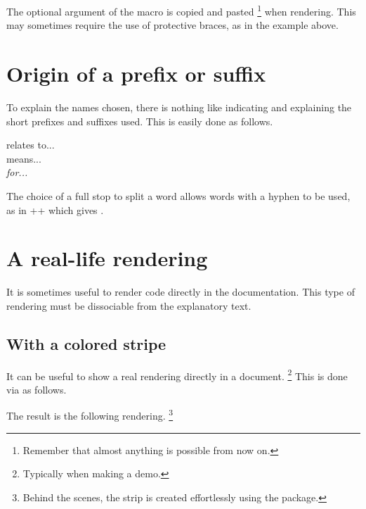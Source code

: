 \begin{tdocwarn}
    The optional argument of the  macro is copied and pasted
    \footnote{
        Remember that almost anything is possible from now on.
    }
    when rendering. This may sometimes require the use of protective braces, as in the example above.
\end{tdocwarn}



\section{Origin of a prefix or suffix}

To explain the names chosen, there is nothing like indicating and explaining the short prefixes and suffixes used. This is easily done as follows.


\begin{tdoclatex}[sbs]
 relates to...      \\
 means...   \\
\emph{ for...}
\end{tdoclatex}


\begin{tdocrem}
    The choice of a full stop to split a word allows words with a hyphen to be used, as in \tdocinlatex++ which gives .
\end{tdocrem}


\section{A real-life rendering}
\label{tutodoc-showcase}

It is sometimes useful to render code directly in the documentation. This type of rendering must be dissociable from the explanatory text.



\subsection{With a colored stripe}

\begin{tdocexa} 
    It can be useful to show a real rendering directly in a document.
    \footnote{
        Typically when making a demo.
    }
    This is done via  as follows.



    The result is the following rendering.
    \footnote{
        Behind the scenes, the strip is created effortlessly using the  package.
    }
\end{tdocexa}

